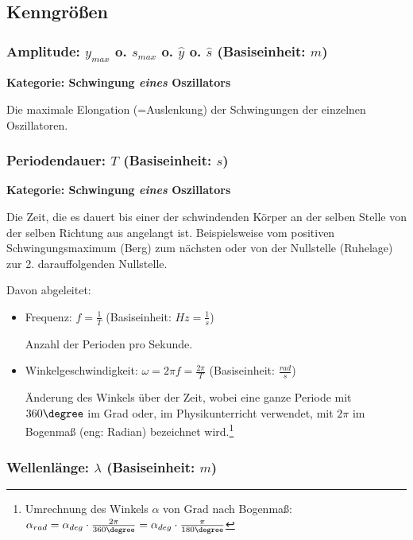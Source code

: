 \subsection{Kenngrößen}


\subsubsection[Amplitude]{Amplitude: $y_{max}$ o. $s_{max}$ o. $\hat{y}$ o. $\hat{s}$ (Basiseinheit: $m$)}

\textbf{Kategorie: Schwingung \textit{eines} Oszillators}

Die maximale Elongation (=\glqq Auslenkung\grqq) der Schwingungen der einzelnen Oszillatoren.



\subsubsection[Periodendauer]{Periodendauer: $T$ (Basiseinheit: $s$)}

\textbf{Kategorie: Schwingung \textit{eines} Oszillators}
	
Die Zeit, die es dauert bis einer der schwindenden Körper an der selben Stelle von der selben Richtung aus angelangt ist. Beispielsweise vom positiven Schwingungsmaximum (\glqq Berg\grqq) zum nächsten oder von der Nullstelle (\glqq Ruhelage\grqq) zur 2. darauffolgenden Nullstelle.

Davon abgeleitet:
\begin{itemize}
	\item Frequenz: $f=\frac{1}{T}$ (Basiseinheit: $Hz=\frac{1}{s}$)
	
	Anzahl der Perioden pro Sekunde.
	\item Winkelgeschwindigkeit: $\omega=2 \pi f=\frac{2 \pi}{T}$ (Basiseinheit: $\frac{rad}{s}$)
		
	Änderung des Winkels über der Zeit, wobei eine ganze Periode mit $360 \degree$ im Grad oder, im Physikunterricht verwendet, mit $2 \pi$ im Bogenmaß (eng: \glqq Radian\grqq) bezeichnet wird.\footnote{Umrechnung des Winkels $\alpha$ von Grad nach Bogenmaß: $\alpha_{rad} = \alpha_{deg} \cdot \frac{2\pi}{360 \degree} = \alpha_{deg} \cdot \frac{\pi}{180 \degree} $}
\end{itemize}



\subsubsection[Wellenlänge]{Wellenlänge: $\lambda$ (Basiseinheit: $m$)}

